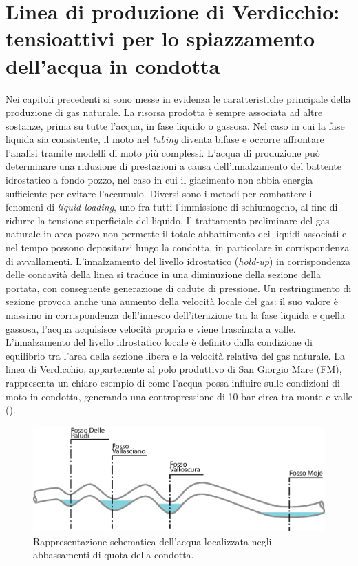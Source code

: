 \clearpage{\pagestyle{empty}\cleardoublepage}
\chapter{Linea di produzione di Verdicchio: tensioattivi per lo spiazzamento dell'acqua in condotta}\thispagestyle{empty} 
Nei capitoli precedenti si sono messe in evidenza le caratteristiche principale della produzione di gas naturale. La risorsa prodotta è sempre associata ad altre sostanze, prima su tutte l'acqua, in fase liquido o gassosa. Nel caso in cui la fase liquida sia consistente, il moto nel \textit{tubing} diventa bifase e occorre affrontare l'analisi tramite modelli di moto più complessi. L'acqua di produzione può determinare una riduzione di prestazioni a causa dell'innalzamento del battente idrostatico a fondo pozzo, nel caso in cui il giacimento non abbia energia sufficiente per evitare l'accumulo. Diversi sono i metodi per combattere i fenomeni di \textit{liquid loading}, uno fra tutti l'immissione di schiumogeno, al fine di ridurre la tensione superficiale del liquido. Il trattamento preliminare del gas naturale in area pozzo non permette il totale abbattimento dei liquidi associati e nel tempo possono depositarsi lungo la condotta, in particolare in corrispondenza di avvallamenti. L'innalzamento del livello idrostatico (\textit{hold-up}) in corrispondenza delle concavità della linea si traduce in una diminuzione della sezione della portata, con conseguente generazione di cadute di pressione. Un restringimento di sezione provoca anche una aumento della velocità locale del gas: il suo valore è massimo in corrispondenza dell'innesco dell'iterazione tra la fase liquida e quella gassosa, l'acqua acquisisce velocità propria e viene trascinata a valle. L'innalzamento del livello idrostatico locale è definito dalla condizione di equilibrio tra l'area della sezione libera e la velocità relativa del gas naturale. La linea di Verdicchio, appartenente al polo produttivo di San Giorgio Mare (FM), rappresenta un chiaro esempio di come l'acqua possa influire sulle condizioni di moto in condotta, generando una contropressione di 10 bar circa tra monte e valle ().\\
\begin{figure}[htbp] 
    \centering
    \includegraphics[width=\textwidth]{fig/test/avvallamenti.eps}
    \caption{Rappresentazione schematica dell'acqua localizzata negli abbassamenti di quota della condotta.} 
    \label{fig:acqua-avvallamenti}
\end{figure}
